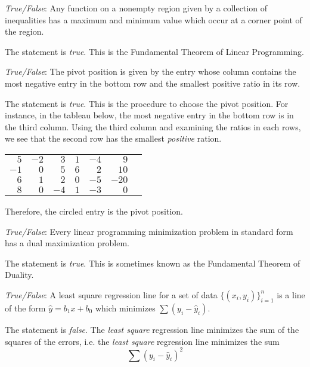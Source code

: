 \documentclass[11pt,letterpaper]{article}
\begin{document}
\newpage



\quizsol \textit{True/False}: Any function on a nonempty region given by a collection of inequalities has a maximum and minimum value which occur at a corner point of the region. \pspace

\sol The statement is \textit{true}. This is the Fundamental Theorem of Linear Programming. \pvspace{1.5cm}



\quizsol \textit{True/False}: The pivot position is given by the entry whose column contains the most negative entry in the bottom row and the smallest positive ratio in its row. \pspace

\sol The statement is \textit{true}. This is the procedure to choose the pivot position. For instance, in the tableau below, the most negative entry in the bottom row is in the third column. Using the third column and examining the ratios in each rows, we see that the second row has the smallest \textit{positive} ration. 
	\begin{table}[!ht]
	\centering
	\begin{tabular}{rrrrr|rr}
	$5$ & $-2$ & $3$ & $1$ & $-4$ & $9$ & \quad {\footnotesize $9/3= 3$} \\
	$-1$ & $0$ & \textcircled{$5$} & $6$ & $2$ & $10$ & \quad {\footnotesize $10/5= 2$} \\
	$6$ & $1$ & $2$ & $0$ & $-5$ & $-20$ & \quad {\footnotesize $-20/2= -10$} \\ \cline{1-6}
	$8$ & $0$ & $-4$ & $1$ & $-3$ & $0$ & \\
	\end{tabular}
	\end{table} \par
Therefore, the circled entry is the pivot position. \pvspace{1.5cm}



\quizsol \textit{True/False}: Every linear programming minimization problem in standard form has a dual maximization problem. \pspace

\sol The statement is \textit{true}. This is sometimes known as the Fundamental Theorem of Duality. \pvspace{1.5cm}



\quizsol \textit{True/False}: A least square regression line for a set of data $\{ (x_i, y_i) \}_{i=1}^n$ is a line of the form $\widehat{y}= b_1x + b_0$ which minimizes $\sum (y_i - \widehat{y}_i)$. \pspace

\sol The statement is \textit{false}. The \textit{least square} regression line minimizes the sum of the squares of the errors, i.e. the \textit{least square} regression line minimizes the sum
	\[
	\sum (y_i - \widehat{y}_i)^2 
	\]
\end{document}
